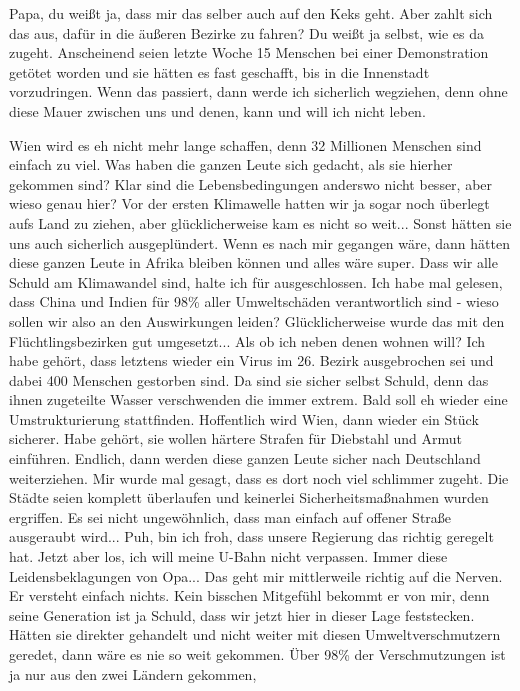\documentclass[twoside, a4paper, DIV=11, open=any, bibliography=totoc]{scrbook}
\begin{document}
Papa, du weißt ja, dass mir das selber auch auf den Keks geht. Aber zahlt sich
das aus, dafür in die äußeren Bezirke zu fahren? Du weißt ja selbst, wie es
da zugeht. Anscheinend seien letzte Woche 15 Menschen bei einer
Demonstration getötet worden und sie hätten es fast geschafft, bis in die
Innenstadt vorzudringen. Wenn das
passiert, dann werde ich sicherlich wegziehen, denn ohne diese Mauer zwischen uns
und denen, kann und will ich
nicht leben. 

Wien wird es eh nicht mehr lange schaffen, denn 32 Millionen Menschen
sind einfach zu viel.
Was haben die ganzen Leute sich gedacht, als sie hierher gekommen sind? Klar sind
die Lebensbedingungen anderswo
nicht besser, aber wieso genau hier? Vor der ersten Klimawelle hatten wir ja sogar
noch überlegt aufs Land zu
ziehen, aber glücklicherweise kam es nicht so weit... Sonst hätten sie uns auch
sicherlich ausgeplündert.
Wenn es nach mir gegangen wäre, dann hätten diese ganzen Leute in Afrika bleiben
können und alles wäre super.
Dass wir alle Schuld am Klimawandel sind, halte ich für ausgeschlossen. Ich habe
mal gelesen, dass China und
Indien für 98\% aller Umweltschäden verantwortlich sind - wieso sollen wir also an
den Auswirkungen leiden?
Glücklicherweise wurde das mit den Flüchtlingsbezirken gut umgesetzt... Als ob ich
neben denen wohnen will?
Ich habe gehört, dass letztens wieder ein Virus im 26. Bezirk ausgebrochen sei und
dabei 400 Menschen gestorben
sind. Da sind sie sicher selbst Schuld, denn das ihnen zugeteilte Wasser
verschwenden die immer extrem.
Bald soll eh wieder eine Umstrukturierung stattfinden. Hoffentlich wird Wien, dann
wieder ein Stück sicherer.
Habe gehört, sie wollen härtere Strafen für Diebstahl und Armut einführen. Endlich,
dann werden diese ganzen
Leute sicher nach Deutschland weiterziehen. Mir wurde mal gesagt, dass es dort noch
viel schlimmer zugeht.
Die Städte seien komplett überlaufen und keinerlei Sicherheitsmaßnahmen wurden
ergriffen. Es sei nicht
ungewöhnlich, dass man einfach auf offener Straße ausgeraubt wird... Puh, bin ich
froh, dass unsere Regierung
das richtig geregelt hat. Jetzt aber los, ich will meine U-Bahn nicht verpassen.
Immer diese Leidensbeklagungen von Opa... Das geht mir mittlerweile richtig auf die
Nerven. Er versteht einfach
nichts. Kein bisschen Mitgefühl bekommt er von mir, denn seine Generation ist ja
Schuld, dass wir jetzt hier
in dieser Lage feststecken. Hätten sie direkter gehandelt und nicht weiter mit
diesen Umweltverschmutzern
geredet, dann wäre es nie so weit gekommen. Über 98\% der Verschmutzungen ist ja nur
aus den zwei Ländern gekommen,
\end{document}
